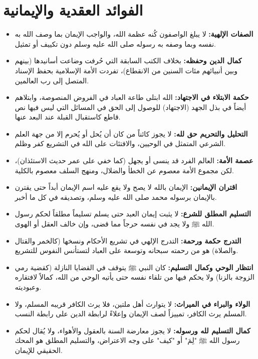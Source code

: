 \section{الفوائد العقدية والإيمانية}
\begin{itemize}
    \item \textbf{الصفات الإلهية:} لا يبلغ الواصفون كُنه عظمة الله، والواجب الإيمان بما وصف الله به نفسه وبما وصفه به رسوله صلى الله عليه وسلم دون تكييف أو تمثيل.
    \item \textbf{كمال الدين وحفظه:} بخلاف الكتب السابقة التي حُرفت وضاعت أسانيدها (بينهم وبين أنبيائهم مئات السنين من الانقطاع)، تفردت الأمة الإسلامية بحفظ الإسناد المتصل إلى رب العالمين.
    \item \textbf{حكمة الابتلاء في الاجتهاد:} الله ابتلى طاعة العباد في الفروض المنصوصة، وابتلاهم أيضاً في بذل الجهد (الاجتهاد) للوصول إلى الحق في المسائل التي ليس فيها نص قاطع كاستقبال القبلة عند البعد عنها.
    \item \textbf{التحليل والتحريم حق لله:} لا يجوز كائناً من كان أن يُحل أو يُحرم إلا من جهة العلم الشرعي المتمثل في الوحيين، والافتئات على الله في التشريع كفر وظلم.
    \item \textbf{عصمة الأمة:} العالم الفرد قد ينسى أو يجهل (كما خفي على عمر حديث الاستئذان)، لكن مجموع الأمة معصوم عن الخطأ والضلال، ومنهج السلف معصوم بالكلية.
    \item \textbf{اقتران الإيمانين:} الإيمان بالله لا يصح ولا يقع عليه اسم الإيمان أبداً حتى يقترن بالإيمان برسوله محمد صلى الله عليه وسلم، وتصديقه في كل ما أخبر.
    \item \textbf{التسليم المطلق للشرع:} لا يثبت إيمان العبد حتى يسلم تسليماً مطلقاً لحكم رسول الله ﷺ ولا يجد في نفسه حرجاً مما قضى، وإن خالف العقل أو الهوى.
    \item \textbf{التدرج حكمة ورحمة:} التدرج الإلهي في تشريع الأحكام ونسخها (كالخمر والقتال والصلاة) هو من رحمته سبحانه وتوسعة على العباد لتستأنس النفوس للتشريع.
    \item \textbf{انتظار الوحي وكمال التسليم:} كان النبي ﷺ يتوقف في القضايا النازلة (كقضية رمي الزوجة بالزنا) ولا يحكم فيها من تلقاء نفسه حتى يأتيه الوحي من الله، كمالاً لافتقاره وعبوديته.
    \item \textbf{الولاء والبراء في الميراث:} لا يتوارث أهل ملتين، فلا يرث الكافر قريبه المسلم، ولا المسلم يرث الكافر، تمييزاً لصف الإيمان وإعلاءً لرابطة الدين على رابطة النسب.
    \item \textbf{كمال التسليم لله ورسوله:} لا يجوز معارضة السنة بالعقول والأهواء، ولا يُقال لحكم رسول الله ﷺ "لِمَ" أو "كيف" على وجه الاعتراض، والتسليم المطلق هو المحك الحقيقي للإيمان.

\end{itemize}
